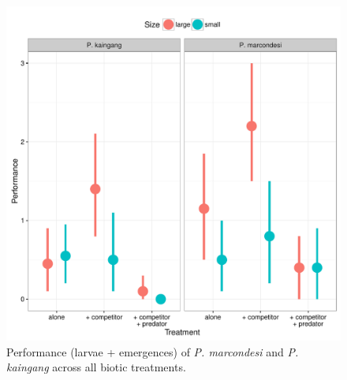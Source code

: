 \begin{figure}[htbp]
\centering
\includegraphics[width=5.5in]{figures/anova_data.pdf}
\caption[Performance (larvae + emergences) of \emph{P. marcondesi} and
\emph{P. kaingang}.]{Performance (larvae + emergences) of \emph{P. marcondesi} and
\emph{P. kaingang} across all biotic treatments.}
\label{fig:performance}
\end{figure}


